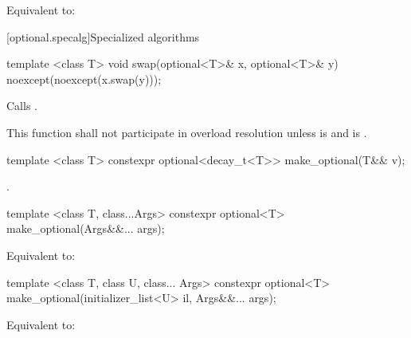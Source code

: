 \begin{itemdescr}
\pnum
\effects
Equivalent to: 
\end{itemdescr}


[optional.specalg]{Specialized algorithms}

%
\begin{itemdecl}
template <class T> void swap(optional<T>& x, optional<T>& y) noexcept(noexcept(x.swap(y)));
\end{itemdecl}

\begin{itemdescr}
\pnum
\effects
Calls .

\pnum
\remarks This function shall not participate in overload resolution
unless  is  and
 is .
\end{itemdescr}

%
\begin{itemdecl}
template <class T> constexpr optional<decay_t<T>> make_optional(T&& v);
\end{itemdecl}

\begin{itemdescr}
\pnum
\returns
{}.
\end{itemdescr}

%
\begin{itemdecl}
template <class T, class...Args>
  constexpr optional<T> make_optional(Args&&... args);
\end{itemdecl}

\begin{itemdescr}
\pnum
\effects Equivalent to: 
\end{itemdescr}

%
\begin{itemdecl}
template <class T, class U, class... Args>
  constexpr optional<T> make_optional(initializer_list<U> il, Args&&... args);
\end{itemdecl}

\begin{itemdescr}
\pnum
\effects Equivalent to: 
\end{itemdescr}

